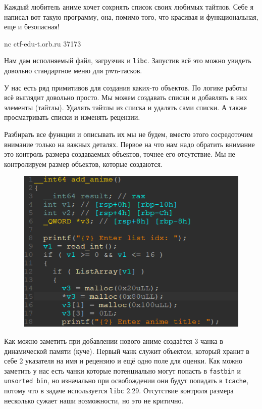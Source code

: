 \documentclass[idxtotoc,hyperref,openany,oneside]{files/pwn} %
\begin{document}
\begin{tcolorbox}
Каждый любитель аниме хочет сохрнять список своих любимых тайтлов. Себе я написал вот такую программу, она, помимо того, что красивая и функциональная, еще и безопасная!

nc ctf-edu-t.orb.ru 37173
\end{tcolorbox}

Нам дам исполняемый файл, загрузчик и \verb|libc|. Запустив всё это можно увидеть довольно стандартное меню для pwn-тасков.

У нас есть ряд примитивов для создания каких-то объектов. По логике работы всё выглядит довольно просто. Мы можем создавать списки и добавлять в них элементы (тайтлы). Удалять тайтлы из списка и удалять сами списки. А также просматривать списки и изменять рецензии.

Разбирать все функции и описывать их мы не будем, вместо этого сосредоточим внимание только на важных деталях. Первое на что нам надо обратить внимание это контроль размера создаваемых объектов, точнее его отсутствие. Мы не контролируем размер объектов, которые создаются.
\begin{figure}[H]
\begin{center}
\includegraphics[width=1.0\linewidth]{files/mal-add-anime}
\end{center}
\label{fig:mal-add-anime}
\end{figure}

Как можно заметить при добавлении нового аниме создаётся 3 чанка в динамической памяти (куче). Первый чанк служит объектом, который хранит в себе 2 указателя на имя и рецензию и ещё одно поле для оценки. Как можно заметить у нас есть чанки которые потенциально могут попасть в \verb|fastbin| и \verb|unsorted bin|, но изначально при освобождении они будут попадать в \verb|tcache|, потому что в задаче используется \verb|libc| $2.29$. Отсутствие контроля размера несколько сужает наши возможности, но это не критично.
\end{document}
